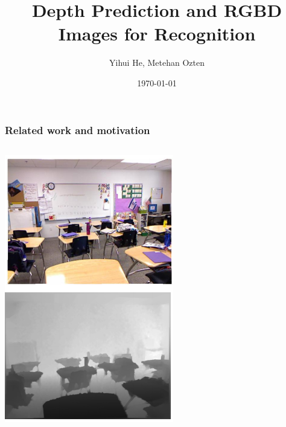 \documentclass{beamer}
\title[Depth Prediction and RGBD Images for Recognition]{Depth Prediction and RGBD Images for Recognition} %
\author{Yihui He, Metehan Ozten}
\institute[ ] %
{
\textit{yihuihe@foxmail.com, m\_ozten@umail.ucsb.edu}\\
\medskip


}\date{\today}
\begin{document}
\begin{frame}
\titlepage
\end{frame}

\begin{frame}
\frametitle{Related work and motivation}
\begin{columns}
\begin{column}{.4\textwidth}
\includegraphics[width=\linewidth]{im2d.png}

\end{column}
\end{columns}
\end{frame}
\end{document}
